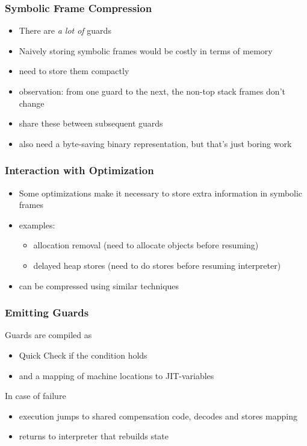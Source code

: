 \documentclass[utf8x]{beamer}
\begin{document}
\begin{frame}
  \frametitle{Symbolic Frame Compression}
  \begin{itemize}
      \item There are \emph{a lot of} guards
      \item Naively storing symbolic frames would be costly in terms of memory
      \item need to store them compactly
      \item observation: from one guard to the next, the non-top stack frames don't change
      \item share these between subsequent guards
      \pause
      \item also need a byte-saving binary representation, but that's just boring work
  \end{itemize}
\end{frame}

\begin{frame}
  \frametitle{Interaction with Optimization}
  \begin{itemize}
      \item Some optimizations make it necessary to store extra information in symbolic frames
      \item examples:
          \begin{itemize}
              \item allocation removal (need to allocate objects before resuming)
              \item delayed heap stores (need to do stores before resuming interpreter)
          \end{itemize}
      \item can be compressed using similar techniques
  \end{itemize}
\end{frame}

\begin{frame}
  \frametitle{Emitting Guards}
  Guards are compiled as
  \begin{itemize}
    \item Quick Check if the condition holds
    \item and a mapping of machine locations to JIT-variables %
  \end{itemize}
  In case of failure
  \begin{itemize}
    \item execution jumps to shared compensation code, decodes and stores mapping
    \item returns to interpreter that rebuilds state
  \end{itemize}
\end{frame}
\end{document}
